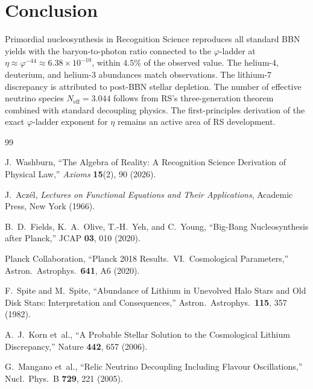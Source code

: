 \documentclass[12pt,a4paper]{article}
\theoremstyle{definition}
\theoremstyle{remark}
\begin{document}
\section{Conclusion}
\label{sec:conclusion}

Primordial nucleosynthesis in Recognition Science reproduces all
standard BBN yields with the baryon-to-photon ratio connected to
the $\varphi$-ladder at $\eta \approx \varphi^{-44} \approx
6.38 \times 10^{-10}$, within $4.5\%$ of the observed value.
The helium-4, deuterium, and helium-3 abundances match
observations.  The lithium-7 discrepancy is attributed to
post-BBN stellar depletion.  The number of effective neutrino
species $N_{\mathrm{eff}} = 3.044$ follows from RS's
three-generation theorem combined with standard decoupling physics.
The first-principles derivation of the exact $\varphi$-ladder
exponent for $\eta$ remains an active area of RS development.

\begin{thebibliography}{99}

J.~Washburn, ``The Algebra of Reality: A Recognition Science Derivation
of Physical Law,'' \emph{Axioms} \textbf{15}(2), 90 (2026).

J.~Acz\'el, \textit{Lectures on Functional Equations and Their Applications},
Academic Press, New York (1966).

B.~D.~Fields, K.~A.~Olive, T.-H.~Yeh, and C.~Young, ``Big-Bang
Nucleosynthesis after Planck,'' JCAP \textbf{03}, 010 (2020).

Planck Collaboration, ``Planck 2018 Results.\ VI.\ Cosmological
Parameters,'' Astron.\ Astrophys.\ \textbf{641}, A6 (2020).

F.~Spite and M.~Spite, ``Abundance of Lithium in Unevolved Halo
Stars and Old Disk Stars: Interpretation and Consequences,''
Astron.\ Astrophys.\ \textbf{115}, 357 (1982).

A.~J.~Korn et~al., ``A Probable Stellar Solution to the
Cosmological Lithium Discrepancy,'' Nature \textbf{442}, 657
(2006).

G.~Mangano et~al., ``Relic Neutrino Decoupling Including Flavour
Oscillations,'' Nucl.\ Phys.\ B \textbf{729}, 221 (2005).

\end{thebibliography}
\end{document}
